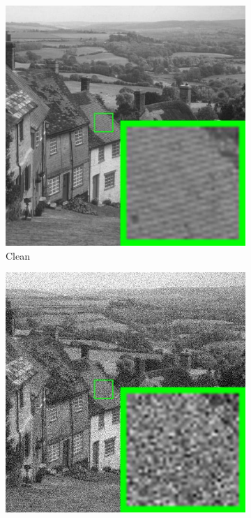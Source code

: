 \begin{figure}
    \centering
    \begin{subfigure}[t]{0.24\textwidth}
        \centering
        \includegraphics[width=1\textwidth]{images/pgpd/pgdpd/br_hill.jpg}
	   \caption{Clean}
    \end{subfigure}
    \hfill
    \begin{subfigure}[t]{0.24\textwidth}
        \centering
        \includegraphics[width=1\textwidth]{images/pgpd/pgdpd/br_30_hill.jpg}

\end{subfigure}
\end{figure}
